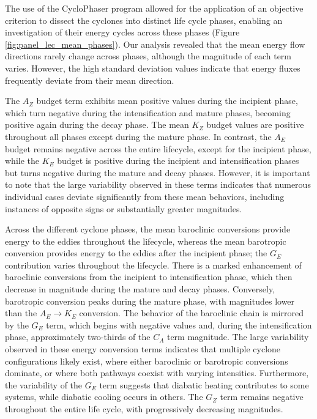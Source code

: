 \documentclass[pdflatex,sn-chicago]{sn-jnl}%
\theoremstyle{plain}
\theoremstyle{definition}
\theoremstyle{remark}
\theoremstyle{definition}
\begin{document}
The use of the CycloPhaser program allowed for the application of an objective criterion to dissect the cyclones into distinct life cycle phases, enabling an investigation of their energy cycles across these phases (Figure \ref{fig:panel_lec_mean_phases}). Our analysis revealed that the mean energy flow directions rarely change across phases, although the magnitude of each term varies. However, the high standard deviation values indicate that energy fluxes frequently deviate from their mean direction.

The $A_Z$ budget term exhibits mean positive values during the incipient phase, which turn negative during the intensification and mature phases, becoming positive again during the decay phase. The mean $K_Z$ budget values are positive throughout all phases except during the mature phase. In contrast, the $A_E$ budget remains negative across the entire lifecycle, except for the incipient phase, while the $K_E$ budget is positive during the incipient and intensification phases but turns negative during the mature and decay phases. However, it is important to note that the large variability observed in these terms indicates that numerous individual cases deviate significantly from these mean behaviors, including instances of opposite signs or substantially greater magnitudes.

Across the different cyclone phases, the mean baroclinic conversions provide energy to the eddies throughout the lifecycle, whereas the mean barotropic conversion provides energy to the eddies after the incipient phase; the $G_E$ contribution varies throughout the lifecycle. There is a marked enhancement of baroclinic conversions from the incipient to intensification phase, which then decrease in magnitude during the mature and decay phases. Conversely, barotropic conversion peaks during the mature phase, with magnitudes lower than the $A_E \rightarrow K_E$ conversion. The behavior of the baroclinic chain is mirrored by the $G_E$ term, which begins with negative values and, during the intensification phase, approximately two-thirds of the $C_A$ term magnitude. The large variability observed in these energy conversion terms indicates that multiple cyclone configurations likely exist, where either baroclinic or barotropic conversions dominate, or where both pathways coexist with varying intensities. Furthermore, the variability of the $G_E$ term suggests that diabatic heating contributes to some systems, while diabatic cooling occurs in others. The $G_Z$ term remains negative throughout the entire life cycle, with progressively decreasing magnitudes.
\end{document}
